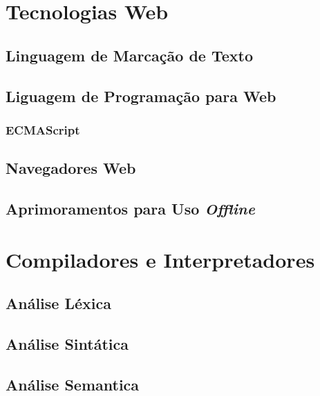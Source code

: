 \section{Tecnologias Web}

\subsection{Linguagem de Marcação de Texto}

\subsection{Liguagem de Programação para Web}

\subsubsection{ECMAScript}

\subsection{Navegadores Web}

\subsection{Aprimoramentos para Uso \textit{Offline}}

\section{Compiladores e Interpretadores}

\subsection{Análise Léxica}

\subsection{Análise Sintática}

\subsection{Análise Semantica}
